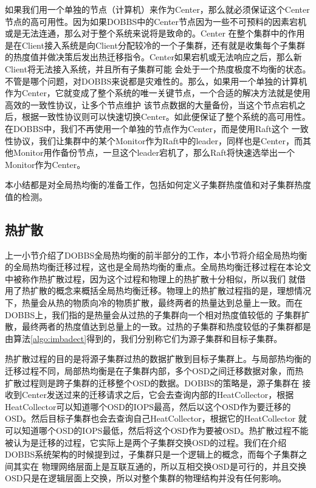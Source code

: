 如果我们用一个单独的节点（计算机）来作为Center，那么就必须保证这个Center节点的高可用性。因为如果DOBBS中的Center节点因为一些不可预料的因素宕机或是无法连通，那么对于整个系统来说将是致命的。Center
在整个集群中的作用是在Client接入系统是向Client分配较冷的一个子集群，还有就是收集每个子集群的热度值并做决策后发出热迁移指令。Center如果宕机或无法响应之后，那么新Client将无法接入系统，并且所有子集群可能
会处于一个热度极度不均衡的状态。不管是哪个问题，对DOBBS来说都是灾难性的。那么，如果用一个单独的计算机作为Center，它就变成了整个系统的唯一关键节点，一个合适的解决方法就是使用高效的一致性协议，让多个节点维护
该节点数据的大量备份，当这个节点宕机之后，根据一致性协议则可以快速切换Center。如此便保证了整个系统的高可用性。在DOBBS中，我们不再使用一个单独的节点作为Center，而是使用Raft\cite{ongaro2014search}这个
一致性协议，我们让集群中的某个Monitor作为Raft中的leader，同样也是Center，而其他Monitor用作备份节点，一旦这个leader宕机了，那么Raft将快速选举出一个Monitor作为Center。

本小结都是对全局热均衡的准备工作，包括如何定义子集群热度值和对子集群热度值的检测。

\subsection{热扩散}
上一小节介绍了DOBBS全局热均衡的前半部分的工作，本小节将介绍全局热均衡的全局热均衡迁移过程，这也是全局热均衡的重点。全局热均衡迁移过程在本论文中被称作热扩散过程，因为这个过程和物理上的热扩散十分相似，所以我们
就借用了热扩散的概念来概括全局热均衡迁移。物理上的热扩散过程指的是，理想情况下，热量会从热的物质向冷的物质扩散，最终两者的热量达到总量上一致。而在DOBBS上，我们指的是热量会从过热的子集群向一个相对热度值较低的
子集群扩散，最终两者的热度值达到总量上的一致。过热的子集群和热度较低的子集群都是由算法\ref{algo:imbadect}得到的，我们分别称它们为源子集群和目标子集群。

热扩散过程的目的是将源子集群过热的数据扩散到目标子集群上。与局部热均衡的迁移过程不同，局部热均衡是在子集群内部，多个OSD之间迁移数据对象，而热扩散过程则是跨子集群的迁移整个OSD的数据。DOBBS的策略是，源子集群在
接收到Center发送过来的迁移请求之后，它会去查询内部的HeatCollector，根据HeatCollector可以知道哪个OSD的IOPS最高，然后以这个OSD作为要迁移的OSD。然后目标子集群也会去查询自己HeatCollector，根据它的HeatCollector
就可以知道哪个OSD的IOPS最低，然后将这个OSD作为要被OSD。热扩散过程不能被认为是迁移的过程，它实际上是两个子集群交换OSD的过程。我们在介绍DOBBS系统架构的时候提到过，子集群只是一个逻辑上的概念，而每个子集群之间其实在
物理网络层面上是互联互通的，所以互相交换OSD是可行的，并且交换OSD只是在逻辑层面上交换，所以对整个集群的物理结构并没有任何影响。





